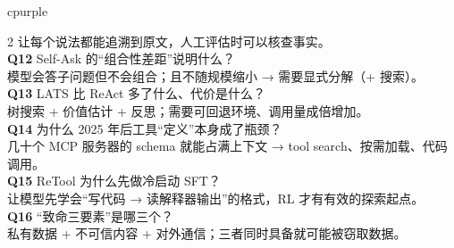 \documentclass[8pt]{extarticle}
\begin{document}
\begin{minipage}[t]{0.625\linewidth}
\begin{tbox}[title={自测：看完应该能回答（16 问）}]{cpurple}
\begin{multicols}{2}
让每个说法都能追溯到原文，人工评估时可以核查事实。\\[1pt]
\textbf{Q12} Self-Ask 的“组合性差距”说明什么？\\
模型会答子问题但不会组合；且不随规模缩小 → 需要显式分解（+ 搜索）。\\[1pt]
\textbf{Q13} LATS 比 ReAct 多了什么、代价是什么？\\
树搜索 + 价值估计 + 反思；需要可回退环境、调用量成倍增加。\\[1pt]
\textbf{Q14} 为什么 2025 年后工具“定义”本身成了瓶颈？\\
几十个 MCP 服务器的 schema 就能占满上下文 → tool search、按需加载、代码调用。\\[1pt]
\textbf{Q15} ReTool 为什么先做冷启动 SFT？\\
让模型先学会“写代码 → 读解释器输出”的格式，RL 才有有效的探索起点。\\[1pt]
\textbf{Q16} “致命三要素”是哪三个？\\
私有数据 + 不可信内容 + 对外通信；三者同时具备就可能被窃取数据。
\end{multicols}
\end{tbox}
\end{minipage}\hfill
\end{document}
